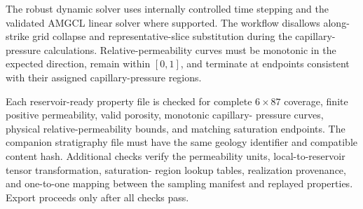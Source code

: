 The robust dynamic solver uses internally controlled time stepping and the
validated AMGCL linear solver where supported. The workflow disallows
along-strike grid collapse and representative-slice substitution during the
capillary-pressure calculations. Relative-permeability curves must be
monotonic in the expected direction, remain within $[0,1]$, and terminate at
endpoints consistent with their assigned capillary-pressure regions.



Each reservoir-ready property file is checked for complete $6\times87$
coverage, finite positive permeability, valid porosity, monotonic capillary-
pressure curves, physical relative-permeability bounds, and matching
saturation endpoints. The companion stratigraphy file must have the same
geology identifier and compatible content hash. Additional checks verify the
permeability units, local-to-reservoir tensor transformation, saturation-
region lookup tables, realization provenance, and one-to-one mapping between
the sampling manifest and replayed properties. Export proceeds only after all
checks pass.

